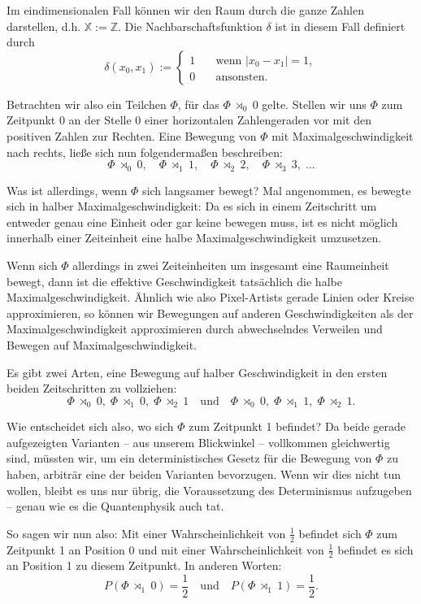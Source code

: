 \documentclass[a4paper,12pt,ngerman]{scrartcl}
\theoremstyle{plain}
\theoremstyle{plain}
\theoremstyle{plain}
\theoremstyle{plain}
\newcommand{\Z}{\mathbb{Z}}
\newcommand{\X}{\mathbb{X}}
\newcommand{\at}[1]{\;\rtimes_{#1}\;}
\begin{document}
Im eindimensionalen Fall können wir den Raum durch die ganze Zahlen darstellen, d.h. $\X := \Z$. Die Nachbarschaftsfunktion $\delta$ ist in diesem Fall definiert durch 
\[\delta(x_0,x_1):=\begin{cases}
1 \quad&\mbox{wenn } |x_0-x_1|=1,\\
0 \quad&\mbox{ansonsten.}
\end{cases}\]

Betrachten wir also ein Teilchen $\Phi$, für das $\Phi \at{0} 0$ gelte. Stellen wir uns $\Phi$ zum Zeitpunkt 0 an der Stelle 0 einer horizontalen Zahlengeraden vor mit den positiven Zahlen zur Rechten. Eine Bewegung von $\Phi$ mit Maximalgeschwindigkeit nach rechts, ließe sich nun folgendermaßen beschreiben:
\[\Phi \at{0} 0,\quad \Phi \at{1} 1,\quad \Phi \at{2} 2,\quad\Phi\at{3} 3,\;\dots\]

Was ist allerdings, wenn $\Phi$ sich langsamer bewegt? Mal angenommen, es bewegte sich in halber Maximalgeschwindigkeit: Da es sich in einem Zeitschritt um entweder genau eine Einheit oder gar keine bewegen muss, ist es nicht möglich innerhalb einer Zeiteinheit eine halbe Maximalgeschwindigkeit umzusetzen. 

Wenn sich $\Phi$ allerdings in zwei Zeiteinheiten um insgesamt eine Raumeinheit bewegt, dann ist die effektive Geschwindigkeit tatsächlich die halbe Maximalgeschwindigkeit. Ähnlich wie also Pixel-Artists gerade Linien oder Kreise approximieren, so können wir Bewegungen auf anderen Geschwindigkeiten als der Maximalgeschwindigkeit approximieren durch abwechselndes Verweilen und Bewegen auf Maximalgeschwindigkeit.


Es gibt zwei Arten, eine Bewegung auf halber Geschwindigkeit in den ersten beiden Zeitschritten zu vollziehen:
\[\Phi\at{0}0,\;\Phi\at{1}0,\; \Phi\at{2}1 \quad\text{und}\quad \Phi\at{0}0,\;\Phi\at{1}1,\;\Phi\at{2}1.\]

Wie entscheidet sich also, wo sich $\Phi$ zum Zeitpunkt 1 befindet? Da beide gerade aufgezeigten Varianten -- aus unserem Blickwinkel -- vollkommen gleichwertig sind, müssten wir, um ein deterministisches Gesetz für die Bewegung von $\Phi$ zu haben, arbiträr eine der beiden Varianten bevorzugen. Wenn wir dies nicht tun wollen, bleibt es uns nur übrig, die Voraussetzung des Determinismus aufzugeben -- genau wie es die Quantenphysik auch tat. 

So sagen wir nun also: Mit einer Wahrscheinlichkeit von $\frac{1}{2}$ befindet sich $\Phi$ zum Zeitpunkt 1 an Position 0 und mit einer Wahrscheinlichkeit von $\frac{1}{2}$ befindet es sich an Position 1 zu diesem Zeitpunkt. In anderen Worten: 
\[P(\Phi\at{1}0)=\frac{1}{2} \quad\text{und}\quad P(\Phi\at{1}1)=\frac{1}{2}.\]
\end{document}
